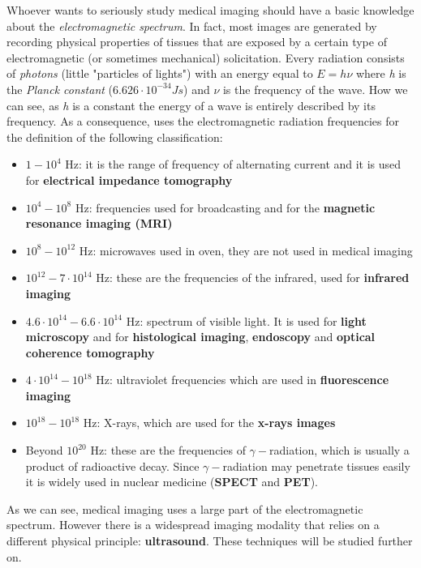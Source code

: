 Whoever wants to seriously study medical imaging should have a basic knowledge about the \textit{electromagnetic spectrum}. In fact, most images are generated by recording physical properties of tissues that are exposed by a certain type of electromagnetic (or sometimes mechanical) solicitation. Every radiation consists of \textit{photons} (little "particles of lights") with an energy equal to $E = h\nu$ where \textit{h} is the \textit{Planck constant} ($6.626 \cdot 10^{-34} Js$) and $\nu$ is the frequency of the wave. How we can see, as \textit{h} is a constant the energy of a wave is entirely described by its frequency. As a consequence, \cite{Birkfellner} uses the electromagnetic radiation frequencies for the definition of the following classification:
\begin{itemize}
 \item $1-10^{4}$ Hz: it is the range of frequency of alternating current and it is used for \textbf{electrical impedance tomography}
 \item $10^{4}-10^{8}$ Hz: frequencies used for broadcasting and for the \textbf{magnetic resonance imaging (MRI)}
 \item $10^{8}-10^{12}$ Hz: microwaves used in oven, they are not used in medical imaging
 \item $10^{12}-7 \cdot 10^{14}$ Hz: these are the frequencies of the infrared, used for \textbf{infrared imaging}
 \item $4.6 \cdot 10^{14}-6.6 \cdot 10^{14}$ Hz: spectrum of visible light. It is used for \textbf{light microscopy} and for \textbf{histological imaging}, \textbf{endoscopy} and \textbf{optical coherence tomography} 
 \item $4 \cdot 10^{14}-10^{18}$ Hz: ultraviolet frequencies which are used in \textbf{fluorescence imaging}
 \item $10^{18}-10^{18}$ Hz: X-rays, which are used for the \textbf{x-rays images}
 \item Beyond $10^{20}$ Hz: these are the frequencies of $\gamma-$radiation, which is usually a product of radioactive decay. Since $\gamma-$radiation may penetrate tissues easily it is widely used in nuclear medicine (\textbf{SPECT} and \textbf{PET}).
\end{itemize}

As we can see, medical imaging uses a large part of the electromagnetic spectrum. However there is a widespread imaging modality that relies on a different physical principle: \textbf{ultrasound}. These techniques will be studied further on.\\

